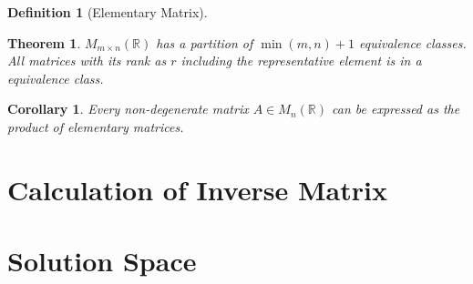 \documentclass[onecolumn]{ctexart}
\newtheorem{definition}{Definition}
\newtheorem{theorem}{Theorem}
\newtheorem{corollary}{Corollary}
\begin{document}
\begin{definition}[Elementary Matrix]
  
\end{definition}

\begin{theorem}
  $M_{m \times n}(\mathbb{R})$ has a partition of $\min(m, n) + 1$ equivalence 
  classes. All matrices with its rank as $r$ including the representative 
  element is in a equivalence class.
\end{theorem}

\begin{corollary}
  Every non-degenerate matrix $A \in M_n(\mathbb{R})$ can be expressed as the 
  product of elementary matrices.
\end{corollary}

\section{Calculation of Inverse Matrix}

\section{Solution Space}
\end{document}
